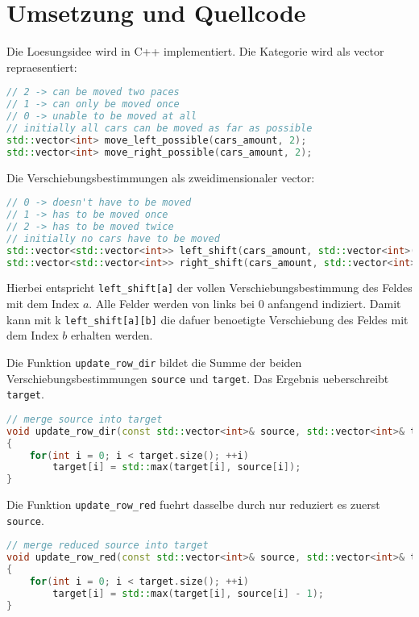 \documentclass[a4paper,10pt,ngerman]{scrartcl}
\begin{document}
\section{Umsetzung und Quellcode}
Die Loesungsidee wird in C++ implementiert.
Die Kategorie wird als vector repraesentiert:
\begin{lstlisting}[language=C++]
// 2 -> can be moved two paces
// 1 -> can only be moved once
// 0 -> unable to be moved at all
// initially all cars can be moved as far as possible
std::vector<int> move_left_possible(cars_amount, 2);
std::vector<int> move_right_possible(cars_amount, 2);
\end{lstlisting}
Die Verschiebungsbestimmungen als zweidimensionaler vector:
\begin{lstlisting}[language=C++]
// 0 -> doesn't have to be moved
// 1 -> has to be moved once
// 2 -> has to be moved twice
// initially no cars have to be moved
std::vector<std::vector<int>> left_shift(cars_amount, std::vector<int>(cars_amount, 0));
std::vector<std::vector<int>> right_shift(cars_amount, std::vector<int>(cars_amount, 0));
\end{lstlisting}
Hierbei entspricht \lstinline{left_shift[a]} der vollen Verschiebungsbestimmung des Feldes mit dem Index $a$.
Alle Felder werden von links bei $0$ anfangend indiziert.
Damit kann mit k \lstinline{left_shift[a][b]} die dafuer benoetigte Verschiebung des Feldes mit dem Index $b$ erhalten werden.

Die Funktion \lstinline{update_row_dir} bildet die Summe der beiden Verschiebungsbestimmungen \lstinline{source} und \lstinline{target}.
Das Ergebnis ueberschreibt \lstinline{target}.
\begin{lstlisting}[language=C++]
// merge source into target
void update_row_dir(const std::vector<int>& source, std::vector<int>& target)
{
    for(int i = 0; i < target.size(); ++i)
        target[i] = std::max(target[i], source[i]);
}
\end{lstlisting}

Die Funktion \lstinline{update_row_red} fuehrt dasselbe durch nur reduziert es zuerst \lstinline{source}.
\begin{lstlisting}[language=C++]
// merge reduced source into target
void update_row_red(const std::vector<int>& source, std::vector<int>& target)
{
    for(int i = 0; i < target.size(); ++i)
        target[i] = std::max(target[i], source[i] - 1);
}
\end{lstlisting}
\end{document}

